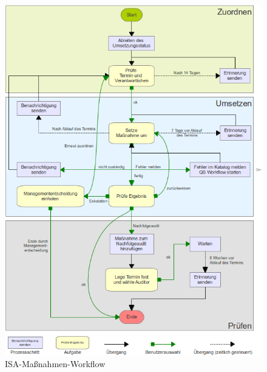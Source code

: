 \documentclass[a4paper,10pt]{book}
\begin{document}
\begin{figure}[htb!]
  \centering
  \includegraphics[scale=.7]{Screenshot/Isa-massnahmen-workflow.png}
  \caption{\label{ISA-Massnahmen-Workflow} ISA-Maßnahmen-Workflow}
\end{figure}
\end{document}
